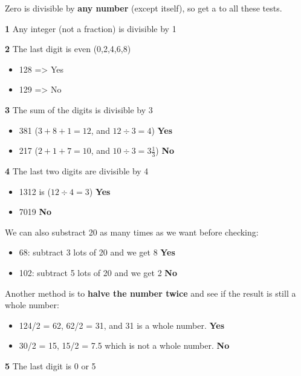 Zero is divisible by \textbf{any number} (except itself), so get a  to all these tests.

\textbf{1} Any integer (not a fraction) is divisible by 1

\textbf{2} The last digit is even (0,2,4,6,8)

\begin{itemize}
  \item 128 => Yes
  \item 129 => No
\end{itemize}

\textbf{3} The sum of the digits is divisible by 3

\begin{itemize}
  \item 381 ($3+8+1=12$, and $12 \div 3 = 4$) \textbf{Yes}
  \item 217 ($2+1+7=10$, and $10 \div 3 = 3\frac{1}{3}$) \textbf{No}
\end{itemize}

\vspace{10 mm}

\textbf{4} The last two digits are divisible by 4

\begin{itemize}
  \item 1312 is ($12 \div 4 = 3$) \textbf{Yes}
  \item 7019 \textbf{No}
\end{itemize}

We can also substract 20 as many times as we want before checking:

\begin{itemize}
  \item 68: subtract 3 lots of 20 and we get 8 \textbf{Yes}
  \item 102: subtract 5 lots of 20 and we get 2 \textbf{No}
\end{itemize}

Another method is to \textbf{halve the number twice} and see if the result is still a whole number:

\begin{itemize}
  \item 124/2 = 62, 62/2 = 31, and 31 is a whole number. \textbf{Yes}
  \item 30/2 = 15, 15/2 = 7.5 which is not a whole number. \textbf{No}
\end{itemize}

\vspace{10 mm}

\textbf{5} The last digit is 0 or 5

